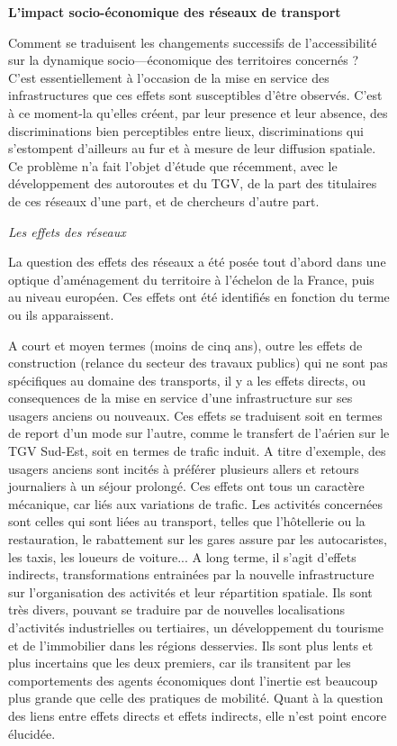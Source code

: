 \begin{figure}[h!]
\begin{mdframed}
\centering\justify
\textbf{L’impact socio-économique des réseaux de transport}

\medskip

Comment se traduisent les changements successifs de
l'accessibilité sur la dynamique socio—économique des territoires concernés ? C’est essentiellement à l’occasion de la mise
en service des infrastructures que ces effets sont susceptibles
d'être observés. C’est à ce moment-la qu'elles créent, par leur
presence et leur absence, des discriminations bien perceptibles
entre lieux, discriminations qui s'estompent d’ailleurs au fur et
à mesure de leur diffusion spatiale. Ce problème n’a fait l’objet
d’étude que récemment, avec le développement des autoroutes et du TGV, de la part des titulaires de ces réseaux d'une
part, et de chercheurs d’autre part.

\medskip

\textit{Les effets des réseaux}

\medskip

La question des effets des réseaux a été posée tout d'abord
dans une optique d’aménagement du territoire à l’échelon de la
France, puis au niveau européen. Ces effets ont été identifiés
en fonction du terme ou ils apparaissent.

A court et moyen termes (moins de cinq ans), outre les
effets de construction (relance du secteur des travaux publics)
qui ne sont pas spécifiques au domaine des transports, il y a les
effets directs, ou consequences de la mise en service d’une
infrastructure sur ses usagers anciens ou nouveaux. Ces effets
se traduisent soit en termes de report d’un mode sur l’autre,
comme le transfert de l’aérien sur le TGV Sud-Est, soit en
termes de trafic induit. A titre d’exemple, des usagers anciens
sont incités à préférer plusieurs allers et retours journaliers à
un séjour prolongé. Ces effets ont tous un caractère mécanique, car liés aux variations de trafic. Les activités concernées sont celles qui sont liées au transport, telles que l'hôtellerie ou la
restauration, le rabattement sur les gares assure par les autocaristes, les taxis, les loueurs de voiture... A long terme, il s’agit
d'effets indirects, transformations entrainées par la nouvelle
infrastructure sur l'organisation des activités et leur répartition spatiale. Ils sont très divers, pouvant se traduire par de
nouvelles localisations d’activités industrielles ou tertiaires,
un développement du tourisme et de l’immobilier dans les
régions desservies. Ils sont plus lents et plus incertains que
les deux premiers, car ils transitent par les comportements des
agents économiques dont l’inertie est beaucoup plus grande
que celle des pratiques de mobilité. Quant à la question des
liens entre effets directs et effets indirects, elle n’est point encore élucidée.



\end{mdframed}
\end{figure}
